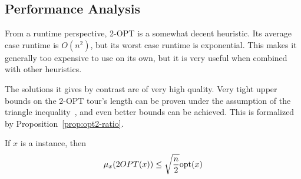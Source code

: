 \subsection{Performance Analysis}

From a runtime perspective, 2-OPT is a somewhat decent heuristic. Its average case runtime is \(O(n^2)\), but its worst case runtime is exponential. This makes it generally too expensive to use on its own, but it is very useful when combined with other heuristics.

The solutions it gives by contrast are of very high quality. Very tight upper bounds on the 2-OPT tour's length can be proven under the assumption of the triangle inequality~\cite{opt2-ratio}, and even better bounds can be achieved. This is formalized by Proposition~\ref{prop:opt2-ratio}.

\begin{proposition}
    \label{prop:opt2-ratio}
    If \(x\) is a \TSP{} instance, then \[\mu_x(2OPT(x))\le \sqrt{n\over 2} \mathrm{opt}(x)\]
\end{proposition}